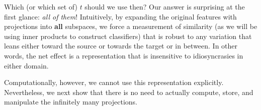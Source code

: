 
Which (or which set of) $t$ should we use then?  Our answer is surprising at the first glance: \emph{all of them}! Intuitively, by expanding the original features with projections into \textbf{all} subspaces, we force a measurement of similarity (as we will be using inner products to construct classifiers) that is robust to any variation that leans either toward the source or towards the target or in between. In other words, the net effect is a representation that is insensitive to idiosyncrasies in either domain. 

Computationally, however, we cannot use this representation explicitly.  Nevertheless, we next show that there is no need to actually compute, store, and  manipulate the infinitely many projections.

